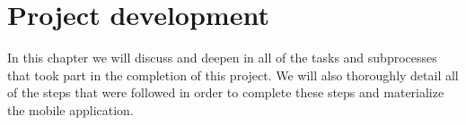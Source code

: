 \chapter{Project development}
\label{chapter6}

In this chapter we will discuss and deepen in all of the tasks and subprocesses that took part in the completion of this project. We will also thoroughly detail all of the steps that were followed in order to complete these steps and materialize the mobile application.